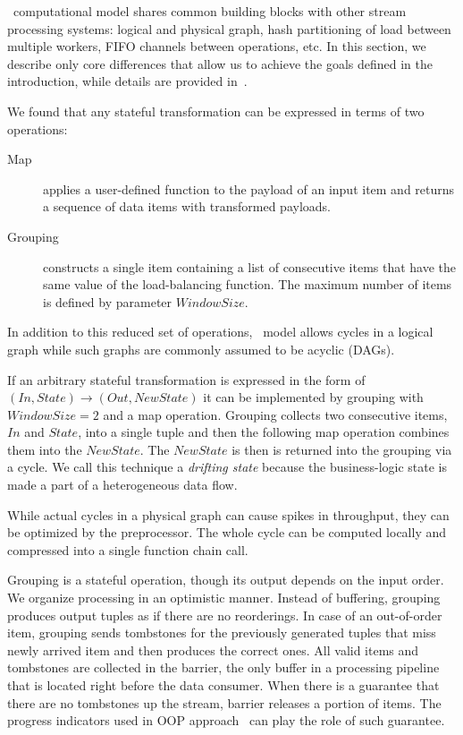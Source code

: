 \label {fs-short-model}

\FlameStream\ computational model shares common building blocks with other stream processing systems: logical and physical graph, hash partitioning of load between multiple workers, FIFO channels between operations, etc. In this section, we describe only core differences that allow us to achieve the goals defined in the introduction, while details are provided in~\cite{we2018seim}.

We found that any stateful transformation can be expressed in terms of two operations:

\begin {description}
  \item [Map] applies a user-defined function to the payload of an input item and returns a sequence of data items with transformed payloads. 
  \item [Grouping] constructs a single item containing a list of consecutive items that have the same value of the load-balancing function. The maximum number of items is defined by parameter $Window Size$. 
\end {description}

In addition to this reduced set of operations, \FlameStream\ model allows cycles in a logical graph while such graphs are commonly assumed to be acyclic (DAGs).

If an arbitrary stateful transformation is expressed in the form of $(In, State) \rightarrow (Out, NewState)$ it can be implemented by grouping with $WindowSize = 2$ and a map operation. Grouping collects two consecutive items, $In$ and $State$, into a single tuple and then the following map operation combines them into the $NewState$. The $NewState$ is then is returned into the grouping via a cycle. We call this technique a {\it drifting state} because the business-logic state is made a part of a heterogeneous data flow.

While actual cycles in a physical graph can cause spikes in throughput, they can be optimized by the preprocessor. The whole cycle can be computed locally and compressed into a single function chain call.

Grouping is a stateful operation, though its output depends on the input order. We organize processing in an optimistic manner. Instead of buffering, grouping produces output tuples as if there are no reorderings. In case of an out-of-order item, grouping sends tombstones for the previously generated tuples that miss newly arrived item and then produces the correct ones. All valid items and tombstones are collected in the barrier, the only buffer in a processing pipeline that is located right before the data consumer. When there is a guarantee that there are no tombstones up the stream, barrier releases a portion of items. The progress indicators used in OOP approach~\cite{Li:2008:OPN:1453856.1453890} can play the role of such guarantee.
